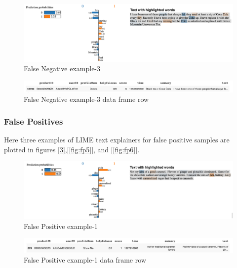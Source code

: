 \documentclass[11pt]{article}
\begin{document}
\begin{figure}
    \centering
    \includegraphics[scale=0.4]{figures/fn3.png}
    \caption{False Negative example-3}
    \label{fig:fn3}
\end{figure}
\begin{figure}
    \centering
    \includegraphics[scale=0.4]{figures/fn3_row.png}
    \caption{False Negative example-3 data frame row}
    \label{fig:fn3_row}
\end{figure}

\subsubsection{False Positives}
Here three examples of LIME text explainers for false positive samples are plotted in figures [\ref{fig:fp4}],[\ref{fig:fp5}], and [\ref{fig:fp6}].
\begin{figure}
    \centering
    \includegraphics[scale=0.4]{figures/fp4.png}
    \caption{False Positive example-1}
    \label{fig:fp4}
\end{figure}
\begin{figure}
    \centering
    \includegraphics[scale=0.4]{figures/fp4_row.png}
    \caption{False Positive example-1 data frame row}
    \label{fig:fp4_row}
\end{figure}
\end{document}
